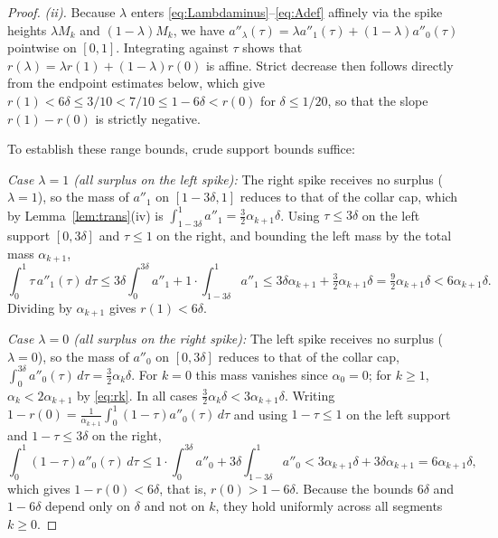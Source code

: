 \documentclass[11pt]{article}
\begin{document}
\begin{proof}
\emph{(ii).}
Because $\lambda$ enters \eqref{eq:Lambdaminus}--\eqref{eq:Adef} affinely via the spike heights $\lambda M_k$ and $(1-\lambda)M_k$, we have $a''_\lambda(\tau) = \lambda a''_1(\tau) + (1-\lambda) a''_0(\tau)$ pointwise on $[0, 1]$.
Integrating against $\tau$ shows that $r(\lambda) = \lambda r(1) + (1-\lambda) r(0)$ is affine.
Strict decrease then follows directly from the endpoint estimates below, which give $r(1) < 6\delta \le 3/10 < 7/10 \le 1-6\delta < r(0)$ for $\delta \le 1/20$, so that the slope $r(1) - r(0)$ is strictly negative.

To establish these range bounds, crude support bounds suffice:

\emph{Case $\lambda=1$ (all surplus on the left spike):}
The right spike receives no surplus ($\lambda=1$), so the mass of $a''_1$ on $[1-3\delta, 1]$ reduces to that of the collar cap, which by Lemma~\ref{lem:trans}(iv) is $\int_{1-3\delta}^1 a''_1 = \tfrac32\alpha_{k+1}\delta$. Using $\tau \le 3\delta$ on the left support $[0, 3\delta]$ and $\tau \le 1$ on the right, and bounding the left mass by the total mass $\alpha_{k+1}$,
\[
\int_0^1 \tau\,a''_1(\tau)\,d\tau \le 3\delta\int_0^{3\delta} a''_1 + 1\cdot\int_{1-3\delta}^1 a''_1 \le 3\delta\alpha_{k+1} + \tfrac32\alpha_{k+1}\delta = \tfrac92\alpha_{k+1}\delta < 6\alpha_{k+1}\delta.
\]
Dividing by $\alpha_{k+1}$ gives $r(1) < 6\delta$.

\emph{Case $\lambda=0$ (all surplus on the right spike):}
The left spike receives no surplus ($\lambda=0$), so the mass of $a''_0$ on $[0, 3\delta]$ reduces to that of the collar cap, $\int_0^{3\delta} a''_0(\tau)\,d\tau = \tfrac32\alpha_k\delta$. For $k=0$ this mass vanishes since $\alpha_0=0$; for $k\ge1$, $\alpha_k < 2\alpha_{k+1}$ by \eqref{eq:rk}. In all cases $\tfrac32\alpha_k\delta < 3\alpha_{k+1}\delta$. Writing $1-r(0) = \frac{1}{\alpha_{k+1}}\int_0^1(1-\tau)a''_0(\tau)\,d\tau$ and using $1-\tau \le 1$ on the left support and $1-\tau \le 3\delta$ on the right,
\[
\int_0^1(1-\tau)a''_0(\tau)\,d\tau \le 1\cdot\int_0^{3\delta} a''_0 + 3\delta\int_{1-3\delta}^1 a''_0 < 3\alpha_{k+1}\delta + 3\delta\alpha_{k+1} = 6\alpha_{k+1}\delta,
\]
which gives $1-r(0) < 6\delta$, that is, $r(0) > 1-6\delta$.
Because the bounds $6\delta$ and $1-6\delta$ depend only on $\delta$ and not on $k$, they hold uniformly across all segments $k \ge 0$.
\end{proof}
\end{document}
